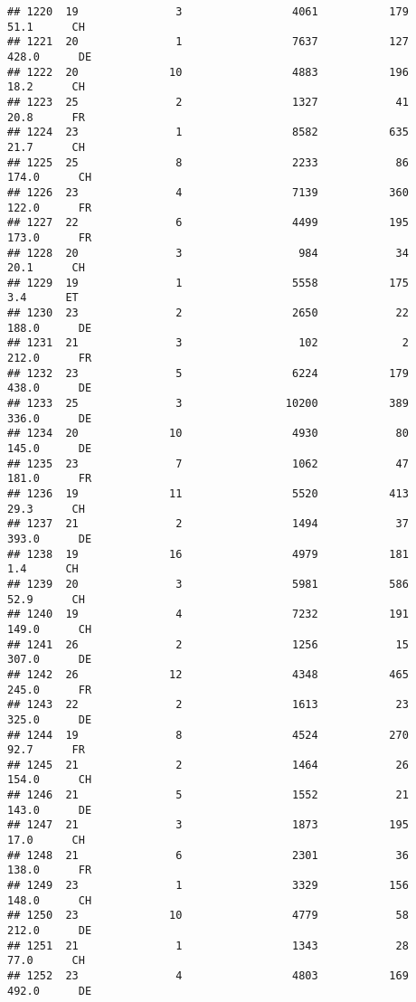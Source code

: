 \documentclass[
]{article}
\begin{document}
\begin{verbatim}
## 1220  19               3                 4061           179     51.1      CH
## 1221  20               1                 7637           127    428.0      DE
## 1222  20              10                 4883           196     18.2      CH
## 1223  25               2                 1327            41     20.8      FR
## 1224  23               1                 8582           635     21.7      CH
## 1225  25               8                 2233            86    174.0      CH
## 1226  23               4                 7139           360    122.0      FR
## 1227  22               6                 4499           195    173.0      FR
## 1228  20               3                  984            34     20.1      CH
## 1229  19               1                 5558           175      3.4      ET
## 1230  23               2                 2650            22    188.0      DE
## 1231  21               3                  102             2    212.0      FR
## 1232  23               5                 6224           179    438.0      DE
## 1233  25               3                10200           389    336.0      DE
## 1234  20              10                 4930            80    145.0      DE
## 1235  23               7                 1062            47    181.0      FR
## 1236  19              11                 5520           413     29.3      CH
## 1237  21               2                 1494            37    393.0      DE
## 1238  19              16                 4979           181      1.4      CH
## 1239  20               3                 5981           586     52.9      CH
## 1240  19               4                 7232           191    149.0      CH
## 1241  26               2                 1256            15    307.0      DE
## 1242  26              12                 4348           465    245.0      FR
## 1243  22               2                 1613            23    325.0      DE
## 1244  19               8                 4524           270     92.7      FR
## 1245  21               2                 1464            26    154.0      CH
## 1246  21               5                 1552            21    143.0      DE
## 1247  21               3                 1873           195     17.0      CH
## 1248  21               6                 2301            36    138.0      FR
## 1249  23               1                 3329           156    148.0      CH
## 1250  23              10                 4779            58    212.0      DE
## 1251  21               1                 1343            28     77.0      CH
## 1252  23               4                 4803           169    492.0      DE

\end{verbatim}
\end{document}
